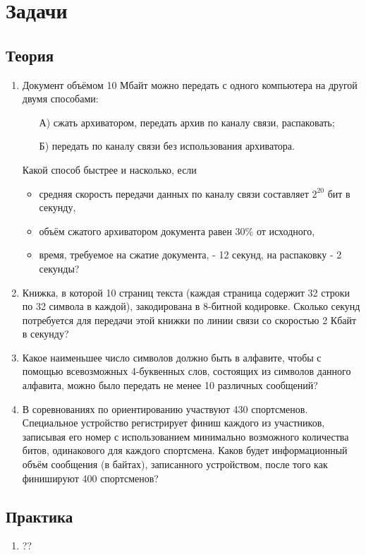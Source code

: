\documentclass[12pt]{article}
\begin{document}
\section*{Задачи}
\subsection*{Теория}
\begin{enumerate}
\item Документ объёмом 10 Мбайт можно передать с одного компьютера на другой двумя способами:
	\begin{itemize}
			\vspace*{-2ex}
		    \setlength{\itemsep}{0pt}%
		    \setlength{\parskip}{0pt}%
		\item[А)] сжать архиватором, передать архив по каналу связи, распаковать; 
		\item[Б)] передать по каналу связи без использования архиватора.
	\end{itemize}
\vspace*{-1.7ex}
Какой способ быстрее и насколько, если
	\begin{itemize}
			\vspace*{-1.5ex}
			\setlength{\itemsep}{0pt}%
		    \setlength{\parskip}{0pt}%
		\item средняя скорость передачи данных по каналу связи составляет $2^{20}$ бит в секунду,
		\item объём сжатого архиватором документа равен 30\% от исходного,
		\item время, требуемое на сжатие документа, - 12 секунд, на распаковку - 2 секунды?
	\end{itemize}

\item Книжка, в которой 10 страниц текста (каждая страница содержит 32 строки по 32 символа в каждой), закодирована в 8-битной кодировке. Сколько секунд потребуется для передачи этой книжки по линии связи со скоростью 2 Кбайт в секунду?
\item Какое наименьшее число символов должно быть в алфавите, чтобы с помощью всевозможных 4-буквенных слов, состоящих из символов данного алфавита, можно было передать не менее 10 различных сообщений? 
\item В соревнованиях по ориентированию участвуют 430 спортсменов. Специальное устройство регистрирует финиш каждого из участников, записывая его номер с использованием минимально возможного количества битов, одинакового для каждого спортсмена. Каков будет информационный объём сообщения (в байтах), записанного устройством, после того как финишируют 400 спортсменов?
\end{enumerate}

\subsection*{Практика}
\begin{enumerate}
\item ??


\end{enumerate}
\end{document}
